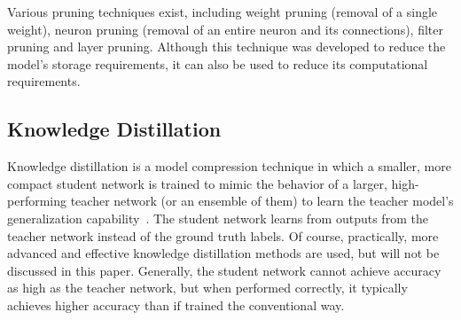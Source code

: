Various pruning techniques exist, including weight pruning (removal of a single
weight), neuron pruning (removal of an entire neuron and its connections),
filter pruning and layer pruning. Although this technique was developed to
reduce the model's storage requirements, it can also be used to reduce its
computational requirements.


\subsection{Knowledge Distillation}


Knowledge distillation is a model compression technique in which a smaller, more
compact student network is trained to mimic the behavior of a larger,
high-performing teacher network (or an ensemble of them) to learn the teacher
model's generalization capability~\cite{Gou2021}. The student network learns
from outputs from the teacher network instead of the ground truth labels. Of
course, practically, more advanced and effective knowledge distillation methods
are used, but will not be discussed in this paper. Generally, the student
network cannot achieve accuracy as high as the teacher network, but when
performed correctly, it typically achieves higher accuracy than if trained the
conventional way.




